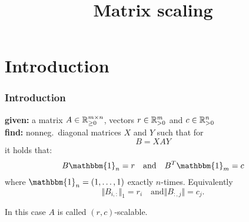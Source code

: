 \documentclass{beamer}
\title{Matrix scaling}
\begin{document}
\maketitle
\frame{\tableofcontents}

\section{Introduction}%

\begin{frame}
  \frametitle{Introduction}
  \textbf{given:} a matrix $A \in \mathbb{R}^{m\times n}_{\ge0}$, vectors $r \in \mathbb{R}_{>0}^m$ and $c \in \mathbb{R}^n_{>0}$\\
  \textbf{find:} nonneg.\ diagonal matrices $X$ and $Y$ such that for
  \begin{equation}
    B = XAY
  \end{equation}
  it holds that:
  \begin{equation}
    B \mathbbm{1}_n = r \quad \text{and} \quad B^T \mathbbm{1}_m = c
  \end{equation}
  where $\mathbbm{1}_n = (1, \dots, 1)$ exactly $n$-times.
  Equivalently
  \begin{equation}
    \Vert B_{i,:} \Vert_1 = r_i \quad \text{and} \Vert B_{:, j} \Vert = c_j.
  \end{equation}

  \begin{block}{}
    \centering
    In this case $A$ is called $(r,c)$-scalable.
  \end{block}
\end{frame}
\end{document}
